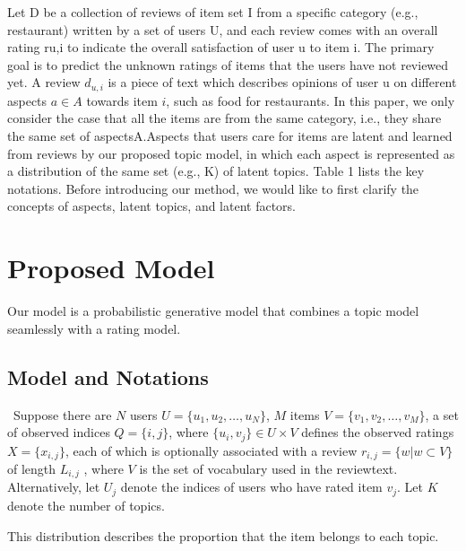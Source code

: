 \documentclass[10pt,conference]{IEEEtran}
\begin{document}
Let D be a collection of reviews of item set I from a specific category (e.g., restaurant) written by a set of users U, and each review comes with an overall rating ru,i to indicate the overall satisfaction of user u to item i. The primary goal is to predict the unknown ratings of items that the users have not reviewed yet. A review $d_{u,i}$ is a piece of text which describes opinions of user u on different aspects $a \in A$ towards item $i$, such as food for restaurants. In this paper, we only consider the case that all the items are from the same category, i.e., they share the same set of aspectsA.Aspects that users care for items are latent and learned from reviews by our proposed topic model, in which each aspect is represented as a distribution of the same set (e.g., K) of latent topics. Table 1 lists the key notations. Before introducing our method, we would like to first clarify the concepts of aspects, latent topics, and latent factors.

\section{Proposed Model}
Our model is a probabilistic generative model that combines a topic model seamlessly with a rating model. 

\subsection{Model and Notations}\
Suppose there are $N$ users $U = \{u_1,u_2, \dots ,u_N\}$, $M$ items
$V = \{v_1, v_2, \dots , v_M\}$, a set of observed indices $Q = \{i, j\}$, where $\{u_i, v_j\} \in U \times V$ defines the observed ratings $X = \{x_{i,j}\}$, each of which is optionally associated with a review $r_{i,j} = \{w|w \subset V\}$ of length $L_{i,j}$ , where $V$ is the set of vocabulary used in the reviewtext. Alternatively, let $U_j$ denote the indices of users who have rated item $v_j$. Let $K$ denote the number of topics.

This distribution describes the proportion that the item belongs to each topic.
\end{document}
